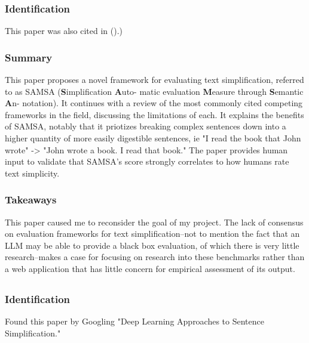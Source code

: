 \documentclass[
	letterpaper, %
]{jdf}
\begin{document}
\subsubsection{Identification}
This paper was also cited in (\cite{stajner-2021-automatic}).)

\subsubsection{Summary}
This paper proposes a novel framework for evaluating text simplification, referred to as SAMSA (\textbf{S}implification \textbf{A}uto-
matic evaluation \textbf{M}easure through \textbf{S}emantic \textbf{A}n-
notation). It continues with a review of the most commonly cited competing frameworks in the field, discussing the limitations of each. It explains the benefits of SAMSA, notably that it priotizes breaking complex sentences down into a higher quantity of more easily digestible sentences, ie "I read the book that John wrote" -> "John wrote a book. I read that book." The paper provides human input to validate that SAMSA's score strongly correlates to how humans rate text simplicity.

\subsubsection{Takeaways}
This paper caused me to reconsider the goal of my project. The lack of consensus on evaluation frameworks for text simplification–not to mention the fact that an LLM may be able to provide a black box evaluation, of which there is very little research–makes a case for focusing on research into these benchmarks rather than a web application that has little concern for empirical assessment of its output.

%
\subsection{}
\subsubsection{Identification}
Found this paper by Googling "Deep Learning Approaches to Sentence Simplification."
\end{document}
